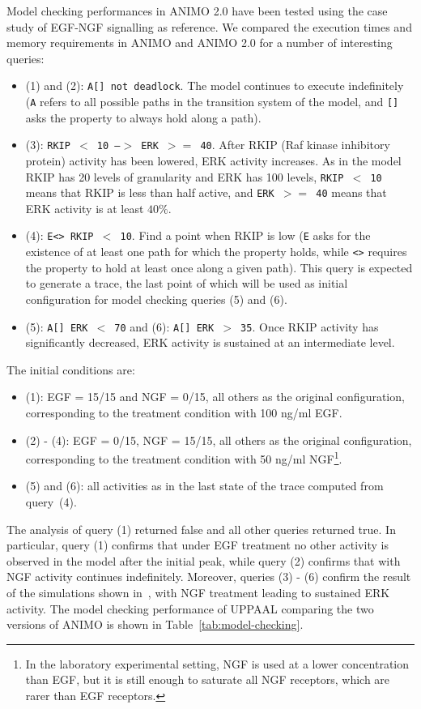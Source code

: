 \documentclass{bmcart}
\begin{document}
Model checking performances in ANIMO 2.0 have been tested using the case study of EGF-NGF signalling as reference.
We compared the execution times and memory requirements in ANIMO and ANIMO 2.0 for a number of interesting queries:
\begin{itemize}
  \item (1) and (2): {\tt A[] not deadlock}. The model continues to execute indefinitely ({\tt A} refers to all
      possible paths in the transition system of the model, and {\tt []} asks the property to always hold along a path).
  \item (3): {\tt RKIP $<$ 10 --$>$ ERK $>=$ 40}. After RKIP (Raf kinase inhibitory protein) activity has been lowered, ERK activity increases. As in the model RKIP
      has 20 levels of granularity and ERK has 100 levels, {\tt RKIP $<$ 10} means that RKIP is less than half active, and
      {\tt ERK $>=$ 40} means that ERK activity is at least $40 \%$.
  \item (4): {\tt E<> RKIP $<$ 10}. Find a point when RKIP is low ({\tt E} asks for the existence of at least one path
      for which the property holds, while {\tt <>} requires the property to hold at least once along a given path).
      This query is expected to generate a trace, the last point of which will be used as initial configuration for model checking queries (5) and (6).
  \item (5): {\tt A[] ERK $<$ 70} and (6): {\tt A[] ERK $>$ 35}. Once RKIP activity has significantly decreased, ERK activity is sustained at an intermediate level.
\end{itemize}
The initial conditions are:
\begin{itemize}
  \item (1): EGF = 15/15 and NGF = 0/15, all others as the original configuration, corresponding to the treatment condition with
	    100 ng/ml EGF.
  \item (2) - (4): EGF = 0/15, NGF = 15/15, all others as the original configuration, corresponding to the treatment condition with
	    50 ng/ml NGF\footnote{In the laboratory experimental setting, NGF is used at a lower concentration than EGF, but it is still enough to saturate all NGF receptors, which
	    are rarer than EGF receptors.}.
  \item (5) and (6): all activities as in the last state of the trace computed from query~(4).
\end{itemize}



The analysis of query (1) returned false and all other queries returned true.
In particular, query (1) confirms that under EGF treatment no other activity is observed in the model after the initial peak,
while query (2) confirms that with NGF activity continues indefinitely.
Moreover, queries (3) - (6) confirm the result of the simulations shown in~\cite{animo-bibe}, with NGF treatment leading to sustained ERK activity.
The model checking performance of UPPAAL comparing the two versions of ANIMO is shown in Table~\ref{tab:model-checking}.
\end{document}
